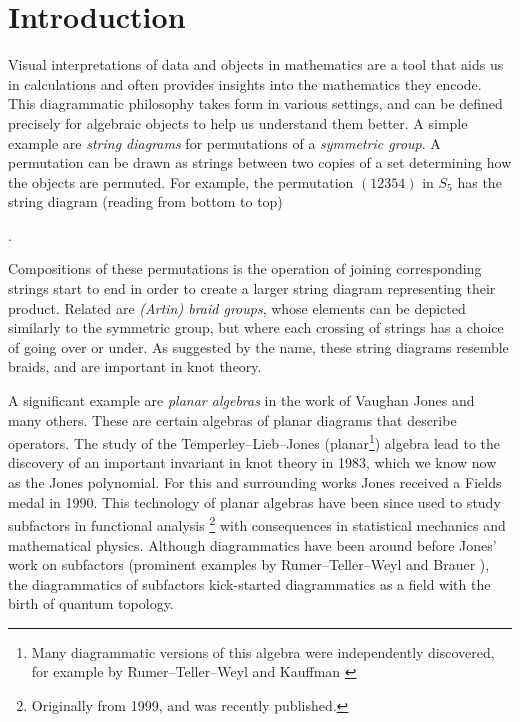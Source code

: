 \chapter{Introduction}

Visual interpretations of data and objects in mathematics are a tool that aids us in calculations and often provides insights into the mathematics they encode. This diagrammatic philosophy takes form in various settings, and can be defined precisely for algebraic objects to help us understand them better. A simple example are \textit{string diagrams} for permutations of a \textit{symmetric group}. A permutation can be drawn as strings between two copies of a set determining how the objects are permuted. For example, the permutation $(12354)$ in $S_5$ has the string diagram (reading from bottom to top)
\begin{center}
    .
\end{center}
Compositions of these permutations is the operation of joining corresponding strings start to end in order to create a larger string diagram representing their product. Related are \textit{(Artin) braid groups}, whose elements can be depicted similarly to the symmetric group, but where each crossing of strings has a choice of going over or under. As suggested by the name, these string diagrams resemble braids, and are important in knot theory.

A significant example are \textit{planar algebras} in the work of Vaughan Jones and many others. These are certain algebras of planar diagrams that describe operators. The study of the Temperley--Lieb--Jones (planar\footnote{Many diagrammatic versions of this algebra were independently discovered, for example by Rumer--Teller--Weyl \cite{weyl-diagrammatics} and Kauffman \cite{kauffman-tl-planar-algebra}}) algebra lead to the discovery of an important invariant in knot theory \cite{jones-knot-polynomial} in 1983, which we know now as the Jones polynomial. For this and surrounding works Jones received a Fields medal in 1990. This technology of planar algebras have been since used to study subfactors in functional analysis \cite{jones-planar-algebra}\footnote{Originally from 1999, and was recently published.} with consequences in statistical mechanics and mathematical physics. Although diagrammatics have been around before Jones' work on subfactors (prominent examples by Rumer--Teller--Weyl \cite{weyl-diagrammatics} and Brauer \cite{brauer-diagrammatics}), the diagrammatics of subfactors kick-started diagrammatics as a field with the birth of quantum topology.

